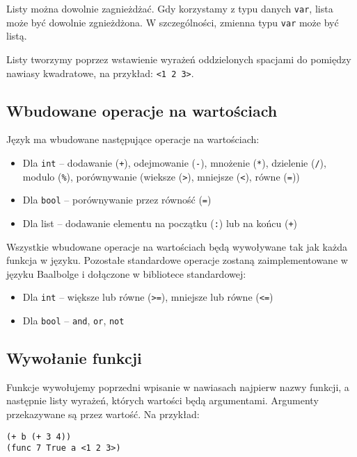 \documentclass{article}
\begin{document}
Listy można dowolnie zagnieżdżać. Gdy korzystamy z typu danych \texttt{var}, lista może być dowolnie zgnieżdżona. W szczególności, zmienna typu \texttt{var} może być listą.

Listy tworzymy poprzez wstawienie wyrażeń oddzielonych spacjami do pomiędzy nawiasy kwadratowe, na przykład: \texttt{<1 2 3>}.

\subsection{Wbudowane operacje na wartościach}

Język ma wbudowane następujące operacje na wartościach:

\begin{itemize}
    \item Dla \texttt{int} -- dodawanie (\texttt{+}), odejmowanie (\texttt{-}), mnożenie (\texttt{*}), dzielenie (\texttt{/}), modulo (\texttt{\%}), porównywanie (wieksze (\texttt{>}), mniejsze (\texttt{<}), równe (\texttt{=}))
    \item Dla \texttt{bool} -- porównywanie przez równość (\texttt{=})
    \item Dla list -- dodawanie elementu na początku (\texttt{:}) lub na końcu (\texttt{+})
\end{itemize}

Wszystkie wbudowane operacje na wartościach będą wywoływane tak jak każda funkcja w języku. Pozostałe standardowe operacje zostaną zaimplementowane w języku Baalbolge i dołączone w bibliotece standardowej:

\begin{itemize}
    \item Dla \texttt{int} -- większe lub równe (\texttt{>=}), mniejsze lub równe (\texttt{<=})
    \item Dla \texttt{bool} -- \texttt{and}, \texttt{or}, \texttt{not}
\end{itemize}

\subsection{Wywołanie funkcji}\label{func:call}

Funkcje wywołujemy poprzedni wpisanie w nawiasach najpierw nazwy funkcji, a następnie listy wyrażeń, których wartości będą argumentami. Argumenty przekazywane są przez wartość. Na przykład:

\begin{lstlisting}
(+ b (+ 3 4))
(func 7 True a <1 2 3>)
\end{lstlisting}
\end{document}
